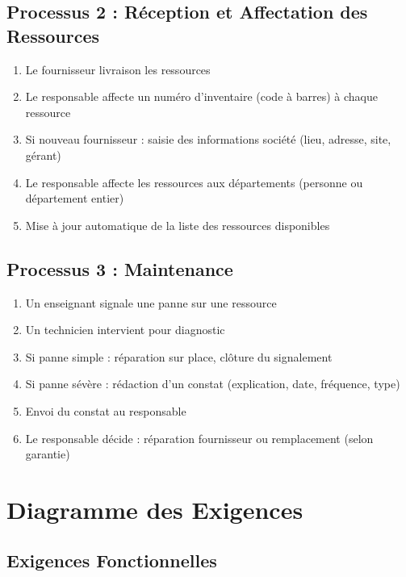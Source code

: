 \subsection{Processus 2 : Réception et Affectation des Ressources}

\begin{enumerate}
    \item Le fournisseur livraison les ressources
    \item Le responsable affecte un numéro d'inventaire (code à barres) à chaque ressource
    \item Si nouveau fournisseur : saisie des informations société (lieu, adresse, site, gérant)
    \item Le responsable affecte les ressources aux départements (personne ou département entier)
    \item Mise à jour automatique de la liste des ressources disponibles
\end{enumerate}

\subsection{Processus 3 : Maintenance}

\begin{enumerate}
    \item Un enseignant signale une panne sur une ressource
    \item Un technicien intervient pour diagnostic
    \item Si panne simple : réparation sur place, clôture du signalement
    \item Si panne sévère : rédaction d'un constat (explication, date, fréquence, type)
    \item Envoi du constat au responsable
    \item Le responsable décide : réparation fournisseur ou remplacement (selon garantie)
\end{enumerate}

\section{Diagramme des Exigences}

\subsection{Exigences Fonctionnelles}


